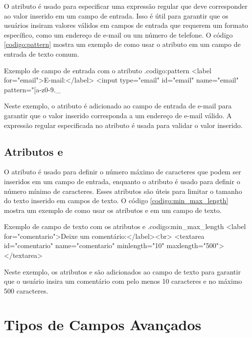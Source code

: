 O atributo  é usado para especificar uma expressão regular que deve corresponder ao valor inserido em um campo de entrada. Isso é útil para garantir que os usuários insiram valores válidos em campos de entrada que requerem um formato específico, como um endereço de e-mail ou um número de telefone. O código \ref{codigo:pattern} mostra um exemplo de como usar o atributo  em um campo de entrada de texto comum.

\begin{htmlcode}{Exemplo de campo de entrada com o atributo .}{codigo:pattern}
<label for="email">E-mail:</label>
<input type="email" id="email" name="email" pattern="[a-z0-9._%
\end{htmlcode}

Neste exemplo, o atributo  é adicionado ao campo de entrada de e-mail para garantir que o valor inserido corresponda a um endereço de e-mail válido. A expressão regular especificada no atributo  é usada para validar o valor inserido.

\subsection{Atributos  e }

O atributo  é usado para definir o número máximo de caracteres que podem ser inseridos em um campo de entrada, enquanto o atributo  é usado para definir o número mínimo de caracteres. Esses atributos são úteis para limitar o tamanho do texto inserido em campos de texto. O código \ref{codigo:min_max_length} mostra um exemplo de como usar os atributos  e  em um campo de texto.

\begin{htmlcode}{Exemplo de campo de texto com os atributos  e .}{codigo:min_max_length}
<label for="comentario">Deixe um comentário:</label><br>
<textarea id="comentario" name="comentario" minlength="10" maxlength="500"></textarea>
\end{htmlcode}

Neste exemplo, os atributos  e  são adicionados ao campo de texto para garantir que o usuário insira um comentário com pelo menos 10 caracteres e no máximo 500 caracteres.

\section{Tipos de Campos Avançados}

